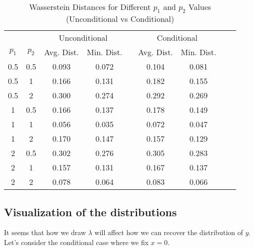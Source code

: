\documentclass[12pt]{article}
\begin{document}
\begin{table}[htbp]
    \centering
    \begin{tabular}{ccccccccc}
        \hline
                  &           & \multicolumn{2}{c}{Unconditional} &            & \multicolumn{2}{c}{Conditional}                           \\
        \cline{3-4} \cline{6-7}
        \(p_{1}\) & \(p_{2}\) & Avg. Dist.                        & Min. Dist. &                                 & Avg. Dist. & Min. Dist. \\
        \hline
        0.5       & 0.5       & 0.093                             & 0.072      &                                 & 0.104      & 0.081      \\
        0.5       & 1         & 0.166                             & 0.131      &                                 & 0.182      & 0.155      \\
        0.5       & 2         & 0.300                             & 0.274      &                                 & 0.292      & 0.269      \\
        1         & 0.5       & 0.166                             & 0.137      &                                 & 0.178      & 0.149      \\
        1         & 1         & 0.056                             & 0.035      &                                 & 0.072      & 0.047      \\
        1         & 2         & 0.170                             & 0.147      &                                 & 0.157      & 0.129      \\
        2         & 0.5       & 0.302                             & 0.276      &                                 & 0.305      & 0.283      \\
        2         & 1         & 0.157                             & 0.131      &                                 & 0.167      & 0.137      \\
        2         & 2         & 0.078                             & 0.064      &                                 & 0.083      & 0.066      \\
        \hline
    \end{tabular}
    \caption{Wasserstein Distances for Different \(p_{1}\) and \(p_{2}\) Values (Unconditional vs Conditional)}
    \label{tab:wasserstein-Beta}
\end{table}
\newpage
\subsection{Visualization of the distributions}
It seems that how we draw \(\lambda\) will affect how we can recover the distribution of \(y\). Let's consider the conditional case where we fix \(x = 0\).
\end{document}
